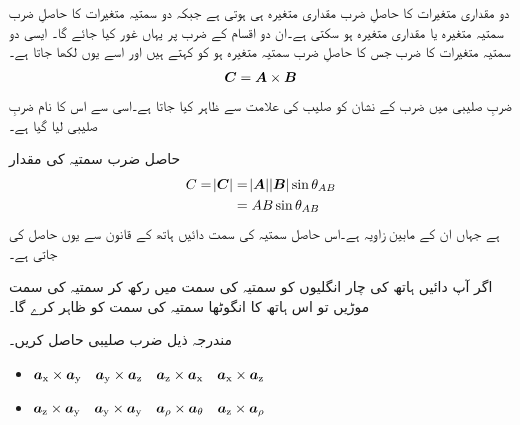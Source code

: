 دو مقداری متغیرات کا حاصلِ ضرب مقداری متغیرہ ہی ہوتی ہے جبکہ دو سمتیہ متغیرات کا حاصلِ ضرب سمتیہ متغیرہ یا مقداری متغیرہ ہو سکتی ہے۔ان دو اقسام کے ضرب پر یہاں غور کیا جائے گا۔
ایسی دو سمتیہ متغیرات کا ضرب جس کا حاصلِ ضرب سمتیہ متغیرہ ہو کو  کہتے ہیں اور اسے یوں لکھا جاتا ہے۔
\begin{align}
{\ensuremath{{\boldsymbol{C}}}}={{\boldsymbol{A}}} \times {\ensuremath{{\boldsymbol{B}}}}
\end{align}
ضربِ صلیبی میں ضرب کے نشان کو صلیب کی علامت سے ظاہر کیا جاتا ہے۔اسی سے اس کا نام ضربِ صلیبی لیا گیا ہے۔

حاصل ضرب سمتیہ  کی مقدار
\begin{gather}
\begin{aligned}\label{مساوات_بنیادی_ضرب_صلیبی_تعریف}
C=\abs{{{\boldsymbol{C}}}} &= \abs {{{\boldsymbol{A}}}} \abs{{{\boldsymbol{B}}}} \sin \theta_{AB}\\
&=A B \sin \theta_{AB}
\end{aligned}
\end{gather}
ہے جہاں  ان کے مابین زاویہ ہے۔اس حاصل سمتیہ کی سمت دائیں ہاتھ  کے قانون سے یوں حاصل کی جاتی ہے۔ 

اگر آپ دائیں ہاتھ کی چار انگلیوں کو سمتیہ  کی سمت میں رکھ کر  سمتیہ کی سمت موڑیں تو اس ہاتھ کا انگوٹھا   سمتیہ کی سمت کو ظاہر کرے گا۔

مندرجہ ذیل ضرب صلیبی حاصل کریں۔
\begin{itemize}
\item
${\boldsymbol{a}}_{\textup{x}} \times {\boldsymbol{a}}_{\textup{y}} \quad {\boldsymbol{a}}_{\textup{y}} \times {\boldsymbol{a}}_{\textup{z}} \quad {\boldsymbol{a}}_{\textup{z}} \times {\boldsymbol{a}}_{\textup{x}} \quad {\boldsymbol{a}}_{\textup{x}} \times {\boldsymbol{a}}_{\textup{z}}$ \\
\item
 ${\boldsymbol{a}}_{\textup{z}} \times {\boldsymbol{a}}_{\textup{y}} \quad {\boldsymbol{a}}_{\textup{y}} \times {\boldsymbol{a}}_{\textup{y}} \quad {\boldsymbol{a}}_{\rho} \times {\boldsymbol{a}}_{\theta} \quad {\boldsymbol{a}}_{\textup{z}} \times {\boldsymbol{a}}_{\rho}$
\end{itemize}

